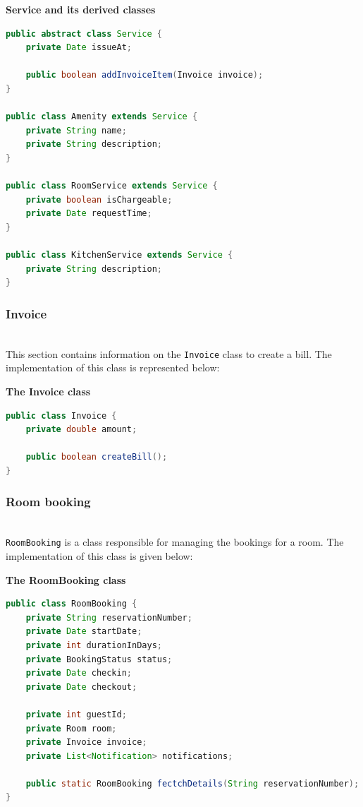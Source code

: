\textbf{Service and its derived classes}

\begin{lstlisting}[language=Java]
public abstract class Service {
    private Date issueAt;

    public boolean addInvoiceItem(Invoice invoice);
}

public class Amenity extends Service {
    private String name;
    private String description;
}

public class RoomService extends Service {
    private boolean isChargeable;
    private Date requestTime;
}

public class KitchenService extends Service {
    private String description;
}
\end{lstlisting}

\subsubsection{Invoice}\label{RM2PViZQ0YfzhcvZAiR0K}
\\
This section contains information on the \texttt{Invoice} class to create a bill. The implementation of this class is represented below:

\textbf{The Invoice class}

\begin{lstlisting}[language=Java]
public class Invoice {
    private double amount;
    
    public boolean createBill();
}
\end{lstlisting}

\subsubsection{Room booking}\label{SRSE9ivjxp87WdBSivLc7}
\\
\texttt{RoomBooking} is a class responsible for managing the bookings for a room. The implementation of this class is given below:

\textbf{The RoomBooking class}

\begin{lstlisting}[language=Java]
public class RoomBooking {
    private String reservationNumber;
    private Date startDate;
    private int durationInDays;
    private BookingStatus status;
    private Date checkin;
    private Date checkout;

    private int guestId;
    private Room room;
    private Invoice invoice;
    private List<Notification> notifications;

    public static RoomBooking fectchDetails(String reservationNumber);
}
\end{lstlisting}

